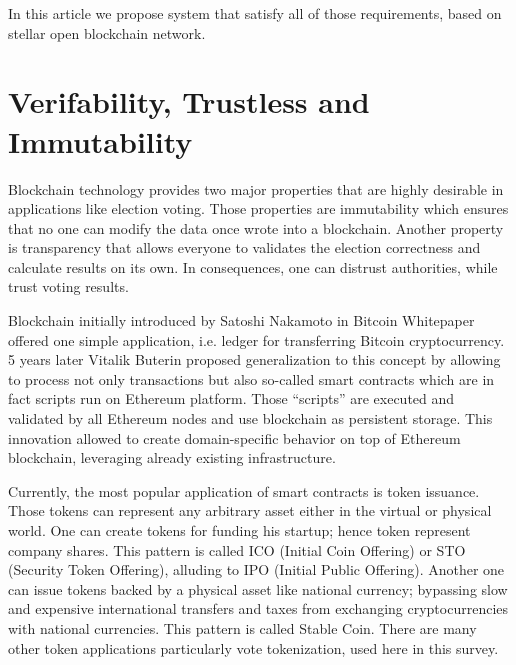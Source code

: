 \documentclass[runningheads]{llncs}
\begin{document}
In this article we propose system that satisfy all of those requirements, based on stellar open blockchain network.



\section{Verifability, Trustless and Immutability}
 Blockchain technology provides two major properties that are highly desirable in applications like election voting. Those properties are immutability which ensures that no one can modify the data once wrote into a blockchain. Another property is transparency that allows everyone to validates the election correctness and calculate results on its own. In consequences, one can distrust authorities, while trust voting results. 

Blockchain initially introduced by Satoshi Nakamoto in Bitcoin Whitepaper offered one simple application, i.e. ledger for transferring Bitcoin cryptocurrency. 5 years later Vitalik Buterin proposed generalization to this concept by allowing to process not only transactions but also so-called smart contracts which are in fact scripts run on Ethereum platform. Those “scripts” are executed and validated by all Ethereum nodes and use blockchain as persistent storage. This innovation allowed to create domain-specific behavior on top of Ethereum blockchain, leveraging already existing infrastructure.

Currently, the most popular application of smart contracts is token issuance. Those tokens can represent any arbitrary asset either in the virtual or physical world. One can create tokens for funding his startup; hence token represent company shares. This pattern is called ICO (Initial Coin Offering) or STO (Security Token Offering), alluding to IPO (Initial Public Offering). Another one can issue tokens backed by a physical asset like national currency; bypassing slow and expensive international transfers and taxes from exchanging cryptocurrencies with national currencies. This pattern is called Stable Coin. There are many other token applications particularly vote tokenization, used here in this survey.
\end{document}
